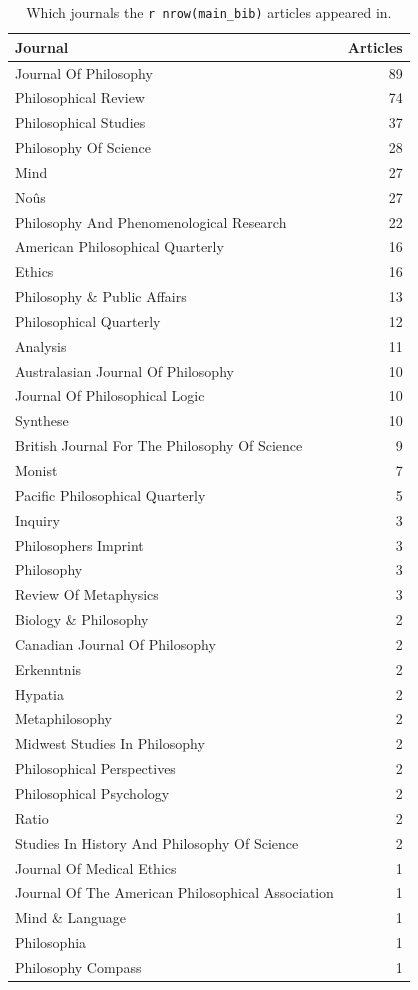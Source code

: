 \documentclass[
  10pt,
  letterpaper,
  DIV=11,
  numbers=noendperiod,
  twoside]{scrartcl}
\begin{document}
\begin{longtable}[]{@{}lr@{}}

\caption{\label{tbl-journals-in-main-bib}Which journals the
\texttt{r\ nrow(main\_bib)} articles appeared in.}

\tabularnewline

\toprule\noalign{}
Journal & Articles \\
\midrule\noalign{}
\endhead
\bottomrule\noalign{}
\endlastfoot
Journal Of Philosophy & 89 \\
Philosophical Review & 74 \\
Philosophical Studies & 37 \\
Philosophy Of Science & 28 \\
Mind & 27 \\
Noûs & 27 \\
Philosophy And Phenomenological Research & 22 \\
American Philosophical Quarterly & 16 \\
Ethics & 16 \\
Philosophy \& Public Affairs & 13 \\
Philosophical Quarterly & 12 \\
Analysis & 11 \\
Australasian Journal Of Philosophy & 10 \\
Journal Of Philosophical Logic & 10 \\
Synthese & 10 \\
British Journal For The Philosophy Of Science & 9 \\
Monist & 7 \\
Pacific Philosophical Quarterly & 5 \\
Inquiry & 3 \\
Philosophers Imprint & 3 \\
Philosophy & 3 \\
Review Of Metaphysics & 3 \\
Biology \& Philosophy & 2 \\
Canadian Journal Of Philosophy & 2 \\
Erkenntnis & 2 \\
Hypatia & 2 \\
Metaphilosophy & 2 \\
Midwest Studies In Philosophy & 2 \\
Philosophical Perspectives & 2 \\
Philosophical Psychology & 2 \\
Ratio & 2 \\
Studies In History And Philosophy Of Science & 2 \\
Journal Of Medical Ethics & 1 \\
Journal Of The American Philosophical Association & 1 \\
Mind \& Language & 1 \\
Philosophia & 1 \\
Philosophy Compass & 1 \\

\end{longtable}
\end{document}
